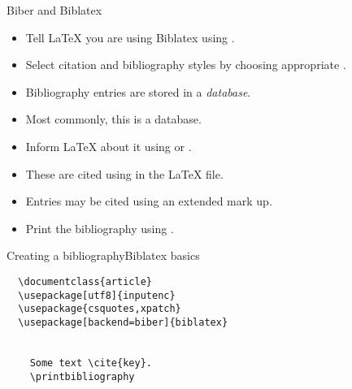 \begin{frame}{Biber and Biblatex}

    \begin{itemize}
      \item Tell \LaTeX{} you are using Biblatex using .
      \item Select citation and bibliography styles by choosing appropriate .
      \item Bibliography entries are stored in a \emph{database}.
      \item Most commonly, this is a \emph{\BibTeX{}} database.
      \item Inform \LaTeX{} about it using  or .
      \item These are cited using  in the \LaTeX{} file.
      \item Entries may be cited using an extended mark up.
      \item Print the bibliography using .
    \end{itemize}

\end{frame}

\begin{frame}[fragile]{Creating a bibliography}{Biblatex basics}

\begin{verbatim}
  \documentclass{article}
  \usepackage[utf8]{inputenc}
  \usepackage{csquotes,xpatch}
  \usepackage[backend=biber]{biblatex}
  
  
    Some text \cite{key}.
    \printbibliography
  
\end{verbatim}

\end{frame}

